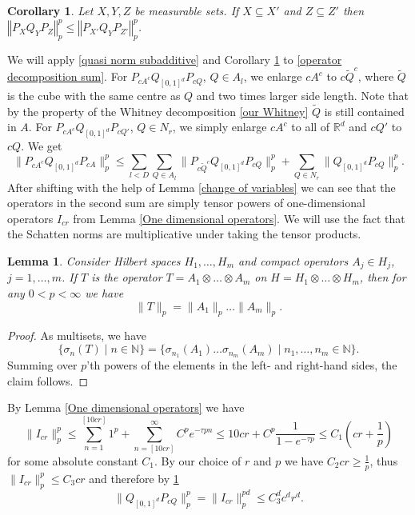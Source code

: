 \documentclass[12pt]{amsart}
\numberwithin{equation}{section}
\newcommand{\N}{\mathbb{N}}
\newcommand{\R}{\mathbb{R}}
\newcommand{\norm}[1]{\left\Vert #1 \right\Vert}
\newtheorem{lemma}[Thm]{Lemma}
\newtheorem{corollary}[Thm]{Corollary}
\begin{document}
\begin{corollary}\label{Schatten monotonicty}
Let $X,Y,Z$ be measurable sets. If $X \subseteq X'$ and $Z\subseteq Z'$ then $\norm{P_X Q_Y P_Z}_p^p \leq \norm{P_{X'} Q_Y P_{Z'}}_p^p$.
\end{corollary}

We will apply \eqref{quasi norm subadditive} and Corollary \ref{Schatten monotonicty} to \eqref{operator decomposition sum}. For $P_{cA^c}Q_{[0,1]^d}P_{cQ}$, $Q\in A_l$, we enlarge $cA^c$ to $c\tilde{Q}^c$, where $\tilde{Q}$ is the cube with the same centre as $Q$ and two times larger side length. Note that by the property of the Whitney decomposition \ref{our Whitney} $\tilde{Q}$ is still contained in $A$. For $P_{cA^c}Q_{[0,1]^d}P_{cQ'}$, $Q\in N_r$, we simply enlarge $cA^c$ to all of $\R^d$ and $cQ'$ to $cQ$. We get
\begin{equation}\label{triangle for box}
    \|P_{cA^c}Q_{[0,1]^d}P_{cA}\|_p^p \le \sum_{l< D} \sum_{Q\in A_l} \| P_{c \tilde{Q}^c} Q_{[0,1]^d} P_{cQ}\|^p_p +\sum_{Q\in N_r} \| Q_{[0,1]^d} P_{cQ}\|^p_p.
\end{equation}
After shifting with the help of Lemma \ref{change of variables} we can see that the operators in the second sum are simply tensor powers of one-dimensional operators $I_{cr}$ from Lemma \ref{One dimensional operators}. We will use the fact that the Schatten norms are multiplicative under taking the tensor products.
\begin{lemma}\label{tensor product Schatten}
Consider Hilbert spaces $H_1,\dots, H_m$ and compact operators $A_j \in H_j$, $j=1,\dots, m$. If $T$ is the operator $T = A_1 \otimes \dots \otimes A_m$ on $H = H_1\otimes \dots \otimes H_m$, then for any $0<p< \infty$ we have
\[
\| T\|_p = \|A_1\|_p \dots \| A_m\|_p.
\]
\end{lemma}
\begin{proof}
As multisets, we have
\[
\{\sigma_n(T) \mid n\in \N\} = \{ \sigma_{n_1}(A_1) \dots \sigma_{n_m}(A_m) \mid n_1,\dots, n_m\in \N\}.
\]
Summing over $p$'th powers of the elements in the left- and right-hand sides, the claim follows. 
\end{proof}

By Lemma \ref{One dimensional operators} we have
$$\|I_{cr}\|_p^p  \le \sum_{n=1}^{[10cr]}1^p + \sum_{n=[10cr]}^\infty C^p e^{-\tau p n} \le 10 cr + C^p \frac{1}{1-e^{-\tau p}} \le C_1\left(cr + \frac{1}{p}\right)$$
for some absolute constant $C_1$. By our choice of $r$ and $p$ we have $C_2cr \ge \frac{1}{p}$, thus $\|I_{cr}\|_p^p \le C_3 cr$ and therefore by \ref{tensor product Schatten}
\[
\| Q_{[0,1]^d} P_{cQ} \|^p_p = \| I_{cr} \|^{pd}_p \leq C_3^d c^d r^d.
\]
\end{document}
